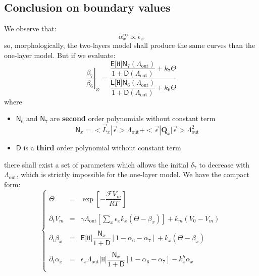 \documentclass[aps,onecolumn,11pt]{revtex4}
\newcommand{\mychem}[1]{\mathtt{#1}}
\newcommand{\myconc}[1]{\big[#1\big]}
\newcommand{\Faraday}{\mathcal{F}}
\newcommand{\spproton}{\mychem{H}}
\newcommand{\proton}{\myconc{\spproton}}
\newcommand{\myout}[1]{{#1}_{\mathrm{out}}}
\newcommand{\mymat}[1]{{\bm{#1}}}
\newcommand{\LiAll}{\Lambda}
\newcommand{\LiAllOut}{\myout{\LiAll}}
\begin{document}
\subsection{Conclusion on boundary values}
We observe that:
\begin{equation}
\alpha_x^\infty \propto \epsilon_x
\end{equation}
so, morphologically, the two-layers model shall produce the same curves than the one-layer model.
But if we evaluate:
\begin{equation}
	\left.\dfrac{\beta_7}{\beta_6}\right\vert_\varnothing = 
	\dfrac{ \dfrac{\mathsf{E}\proton\mathsf{N}_7(\LiAllOut)}{1+\mathsf{D}(\LiAllOut)}+k_7 \Theta}
	{  \dfrac{\mathsf{E}\proton\mathsf{N}_6(\LiAllOut)}{1+\mathsf{D}(\LiAllOut)} +k_6 \Theta}
\end{equation}
where
\begin{itemize}
\item ${\mathsf{N}_6}$ and  ${\mathsf{N}_7}$ are  {\bf second} order polynomials without constant term
\begin{equation}
\mathsf{N}_x = <\vec{L}_x|\vec{\epsilon}> \LiAllOut + <\vec{\epsilon}|\mymat{Q}_x|\vec{\epsilon}>\LiAllOut^2
\end{equation}
\item ${\mathsf{D}}$ is a {\bf third } order polynomial without constant term
\end{itemize}
there shall exist a set of parameters which allows the initial $\delta_7$ to decrease with $\LiAllOut$, which is
strictly impossible for the one-layer model.
We have the compact form:
\begin{equation}
\boxed{
\left\lbrace
\begin{array}{rcl}
	\Theta & = & \exp\left[ -\dfrac{\Faraday V_m}{RT}\right]\\
	\\
	\partial_t V_m & = & \gamma\LiAllOut \left[\sum_x \epsilon_x k_x \left( \Theta -\beta_x \right)  \right] + k_m\left(V_0-V_m\right)\\
	\\
	\partial_t \beta_x  & = & \mathsf{E}\proton \dfrac{\mathsf{N}_x}{1+\mathsf{D}} \left[ 1-\alpha_6-\alpha_7\right] + k_x \left(\Theta-\beta_x\right)\\
	\\
	\partial_t \alpha_x & = & \epsilon_x \LiAllOut \proton \dfrac{\mathsf{N}_x}{1+\mathsf{D}} \left[ 1-\alpha_6-\alpha_7\right] - k^h_x \alpha_x \\
\end{array}
\right.
}
\end{equation}
\end{document}
